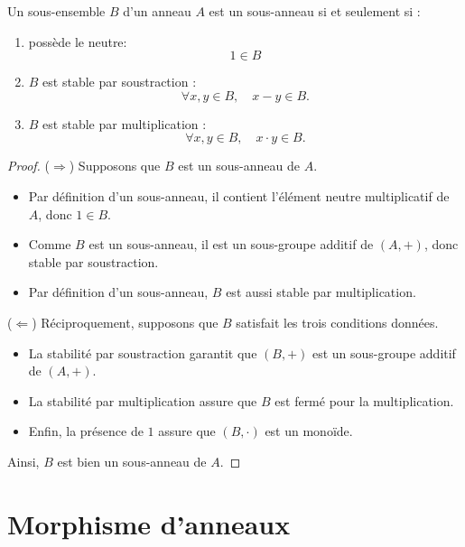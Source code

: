 \begin{lemme}

Un sous-ensemble $B$ d’un anneau $A$ est un sous-anneau si et seulement si :
\begin{enumerate}
    \item possède le neutre:\[1\in B\]
    \item $B$ est stable par soustraction :  
    \[
    \forall x, y \in B, \quad x - y \in B.
    \]
    \item $B$ est stable par multiplication :  
    \[
    \forall x, y \in B, \quad x \cdot y \in B.
    \]
\end{enumerate}
\end{lemme}
\begin{proof}
($\Rightarrow$) Supposons que $B$ est un sous-anneau de $A$.  
\begin{itemize}
    \item Par définition d'un sous-anneau, il contient l’élément neutre multiplicatif de $A$, donc $1 \in B$.
    \item Comme $B$ est un sous-anneau, il est un sous-groupe additif de $(A, +)$, donc stable par soustraction.
    \item Par définition d’un sous-anneau, $B$ est aussi stable par multiplication.
\end{itemize}

($\Leftarrow$) Réciproquement, supposons que $B$ satisfait les trois conditions données.  
\begin{itemize}
    \item La stabilité par soustraction garantit que $(B, +)$ est un sous-groupe additif de $(A, +)$.
    \item La stabilité par multiplication assure que $B$ est fermé pour la multiplication.
    \item Enfin, la présence de $1$ assure que $(B,\cdot)$ est un monoïde.
    
\end{itemize}
Ainsi, $B$ est bien un sous-anneau de $A$.
\end{proof}

\section{Morphisme d'anneaux}

